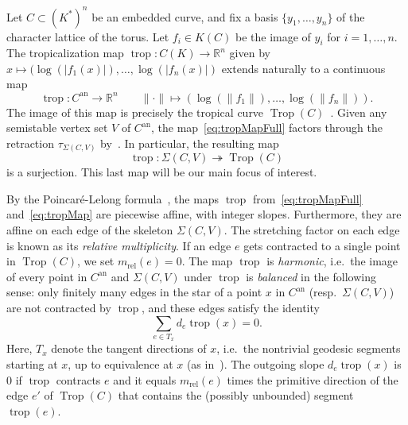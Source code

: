 \documentclass[11pt]{amsart}
\numberwithin{equation}{section}
\theoremstyle{plain}
\theoremstyle{definition}
\theoremstyle{remark}
\begin{document}
Let $C\subset (K^*)^n$ be an embedded curve, and fix a basis
$\{y_1,\ldots, y_n\}$ of the character lattice of the torus. Let
$f_i\in K(C)$ be the image of $y_i$ for $i=1,\ldots, n$. The
tropicalization map $\operatorname{trop}\colon C(K)\to {\mathbb{R}}^n$ given by $x \mapsto
(\log(|f_1(x)|), \ldots, \log(|f_n(x)|)$ extends naturally to a
continuous map
  \begin{equation} \label{eq:tropMapFull}
\operatorname{trop}\colon  C^\operatorname{an} \to {\mathbb{R}}^n \qquad \|\cdot\| \mapsto (\log (\|f_1\|), \ldots, \log(\|f_n\|)).
\end{equation}
The image of this map is precisely the tropical curve
$\operatorname{Trop}(C)$~\cite[$\S 3$]{Gubler13}. Given any semistable vertex set $V$ of
$C^\operatorname{an}$, the map~\eqref{eq:tropMapFull} factors through the retraction
$\tau_{\Sigma(C,V)}$ by~\cite[Theorem 5.15 (1)]{BPRContempMath}. In particular, the resulting map 
\begin{equation}
\operatorname{trop}\colon
\Sigma(C,V)\twoheadrightarrow \operatorname{Trop}(C)\label{eq:tropMap}
\end{equation}
 is a
surjection.  This last map will be our main focus of interest.

By the Poincar\'e-Lelong formula~\cite[Theorem 5.15]{BPRContempMath},
the maps $\operatorname{trop}$ from~\eqref{eq:tropMapFull} and~\eqref{eq:tropMap}
are piecewise affine, with integer slopes. Furthermore, they are
affine on each edge of the skeleton $\Sigma(C,V)$.  The stretching
factor on each edge is known as its \emph{relative multiplicity}.  If
an edge $e$ gets contracted to a single point in $\operatorname{Trop}(C)$, we set
$m_{\operatorname{rel}}(e)=0$. The map $\operatorname{trop}$ is \emph{harmonic},
i.e.\ the image of every point in $C^\operatorname{an}$ and $\Sigma(C,V)$ under
$\operatorname{trop}$ is \emph{balanced} in the following sense: only finitely many
edges in the star of a point $x$ in $C^\operatorname{an}$ (resp.~$\Sigma(C,V)$)
are not contracted by $\operatorname{trop}$, and these edges satisfy the identity
\begin{equation}
\sum_{e \in T_x} d_e\operatorname{trop}(x)= 0\label{eq:balancing}.
\end{equation}
Here, $T_x$ denote the tangent directions of $x$, i.e.\ the nontrivial
geodesic segments starting at $x$, up to equivalence at $x$ (as
in~\cite[$\S 5.11$]{BPRContempMath}). The outgoing slope $d_e\operatorname{trop}(x)$
is $0$ if $\operatorname{trop}$ contracts $e$ and it equals
$m_{\operatorname{rel}}(e)$ times the primitive direction of the edge
$e'$ of $\operatorname{Trop}(C)$ that contains the (possibly unbounded) segment
$\operatorname{trop}(e)$.
\end{document}
